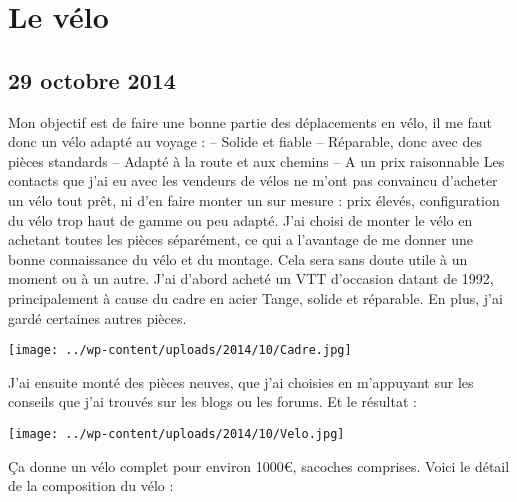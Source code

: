 \chapter{Le vélo}
\section*{29 octobre 2014}
Mon objectif est de faire une bonne partie des déplacements en vélo, il me faut donc un vélo adapté au voyage : \newline
 – Solide et fiable \newline
 – Réparable, donc avec des pièces standards \newline
 – Adapté à la route et aux chemins \newline
 – A un prix raisonnable \newline
 Les contacts que j'ai eu avec les vendeurs de vélos ne m'ont pas convaincu d'acheter un vélo tout prêt, ni d'en faire monter un sur mesure : prix élevés, configuration du vélo trop haut de gamme ou peu adapté. \newline
 J'ai choisi de monter le vélo en achetant toutes les pièces séparément, ce qui a l'avantage de me donner une bonne connaissance du vélo et du montage. Cela sera sans doute utile à un moment ou à un autre. \newline
 J'ai d'abord acheté un VTT d'occasion datant de 1992, principalement à cause du cadre en acier Tange, solide et réparable. En plus, j'ai gardé certaines autres pièces. \newline
 \newline
\centerline{\texttt{[image: ../wp-content/uploads/2014/10/Cadre.jpg]} } 
 \newline
 J'ai ensuite monté des pièces neuves, que j'ai choisies en m'appuyant sur les conseils que j'ai trouvés sur les blogs ou les forums. \newline
 Et le résultat : \newline
 \newline
\centerline{\texttt{[image: ../wp-content/uploads/2014/10/Velo.jpg]} } 
 \newline
 Ça donne un vélo complet pour environ 1000€, sacoches comprises. Voici le détail de la composition du vélo : \newline
